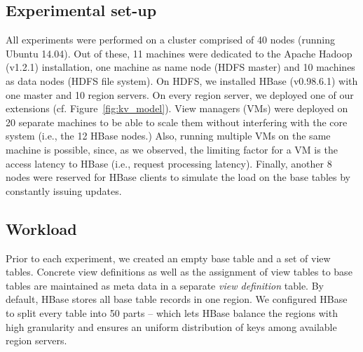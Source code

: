 %
%

\subsection{Experimental set-up}  
All experiments were performed on a
cluster comprised of 40 nodes (running Ubuntu 14.04). Out of these, 11
machines were dedicated to the Apache Hadoop (v1.2.1) installation,
one machine as name node (HDFS master) and 10 machines as data nodes
(HDFS file system). On HDFS, we installed HBase (v0.98.6.1) with one
master and 10 region servers. On every region server, we deployed one 
of our extensions (cf. Figure~\ref{fig:kv_model}). View managers (VMs) 
were deployed on 20 separate
machines to be able to scale them without interfering with the core
system (i.e., the 12 HBase nodes.) Also, running multiple VMs on the
same machine is possible, since, as we observed, the limiting factor
for a VM is the access latency to HBase (i.e., request processing
latency).  Finally, another 8 nodes were reserved for HBase clients to
simulate the load on the base tables by constantly issuing updates.

\subsection{Workload} 
Prior to each experiment, we created an empty
base table and a set of view tables. Concrete view definitions as well
as the assignment of view tables to base tables are maintained as meta
data in a separate \textit{view definition} table. By default, HBase
stores all base table records in one region. We configured
HBase to split every table into 50 parts -- which lets HBase balance 
the regions with high granularity and ensures an uniform
distribution of keys among available region servers. 

